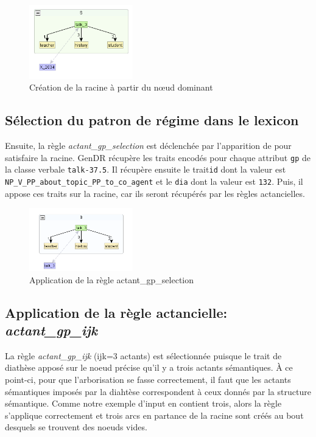 \begin{figure}[htb]
	\centering
	\includegraphics[width=0.4\textwidth, trim = {0cm 0cm 0cm 0cm},clip]{ch6/figs/root.png}
	\caption{Création de la racine à partir du n\oe{}ud dominant}
	\label{deroulement0}
\end{figure}


\subsection{Sélection du patron de régime dans le lexicon}
Ensuite, la règle \emph{actant\_gp\_selection} est déclenchée par l'apparition de  pour satisfaire la racine. GenDR récupère les traits encodés pour chaque attribut \texttt{gp} de la classe verbale \texttt{talk-37.5}. Il récupère ensuite le trait\texttt{id} dont la valeur est \texttt{NP\_V\_PP\_about\_topic\_PP\_to\_co\_agent} et le \texttt{dia} dont la valeur est \texttt{132}. Puis, il appose ces traits sur la racine, car ils seront récupérés par les règles actancielles.

\begin{figure}[htb]
	\centering
	\includegraphics[width=0.4\textwidth, trim = {0cm 0cm 0cm 0cm},clip]{ch6/figs/selectiongp.png}
	\caption{Application de la règle actant\_gp\_selection}
	\label{deroulement1}
\end{figure}

\subsection{Application de la règle actancielle: \emph{actant\_gp\_ijk}}
La règle \emph{actant\_gp\_ijk} (ijk=3 actants) est sélectionnée puisque le trait de diathèse apposé sur le noeud précise qu'il y a trois actants sémantiques. À ce point-ci, pour que l'arborisation se fasse correctement, il faut que les actants sémantiques imposés par la diahtèse correspondent à ceux donnés par la structure sémantique. Comme notre exemple d'input en contient trois, alors la règle s'applique correctement et trois arcs en partance de la racine sont créés au bout desquels se trouvent des noeuds vides.

